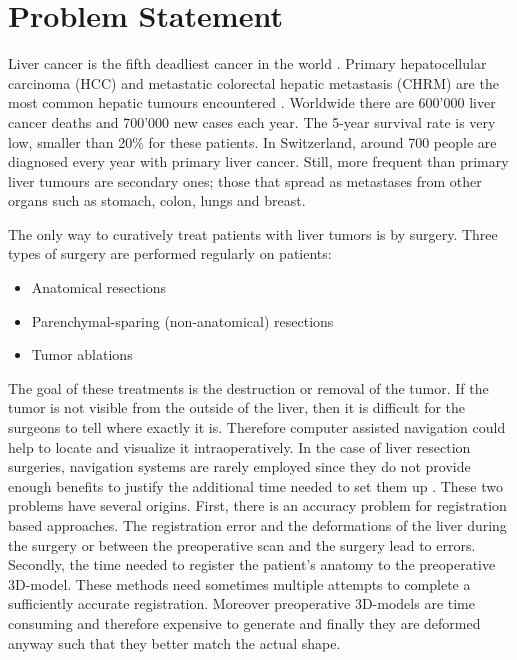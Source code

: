 \chapter{Problem Statement}
Liver cancer is the fifth deadliest cancer in the world \cite{bray2018global}.
Primary hepatocellular carcinoma (HCC) and metastatic colorectal hepatic
metastasis (CHRM) are the most common hepatic tumours encountered \cite{north2014microwave}. Worldwide
there are 600'000 liver cancer deaths and 700'000 new cases each year.
The 5-year survival rate is very low, smaller than 20\% for these
patients. In Switzerland, around 700 people are diagnosed every year with
primary liver cancer. Still, more frequent than primary liver tumours are
secondary ones; those that spread as metastases from other organs such as stomach, colon,
lungs and breast. 

The only way to curatively treat patients with liver tumors is by surgery. Three types of surgery
are performed regularly on patients:
\begin{itemize}
  \item Anatomical resections
  \item Parenchymal-sparing (non-anatomical) resections
  \item Tumor ablations 
\end{itemize}
The goal of these treatments is the destruction or removal of the tumor. If the
tumor is not visible from the outside of the liver, then it is difficult for the
surgeons to tell where exactly it is. Therefore computer assisted navigation
could help to locate and visualize it intraoperatively.
In the case of liver resection surgeries, navigation systems are rarely employed
since they do not provide enough benefits to justify the additional time needed
to set them up \cite{beller2007image}. These two problems have several origins.
First, there is an accuracy problem for registration based approaches. The
registration error and the deformations of the liver during the surgery
\cite{clements2017deformation} or between the preoperative scan and the surgery
lead to errors. Secondly, the time needed to register the patient's anatomy to the
preoperative 3D-model. These methods need sometimes multiple attempts to complete
a sufficiently accurate registration. Moreover preoperative 3D-models are time
consuming and therefore expensive to generate and finally they are deformed
anyway such that they better match the actual shape.

